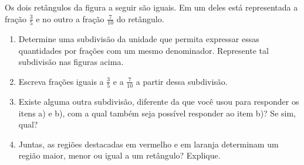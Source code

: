 \begin{atividade}{}\label{chap5-ativ5}

Os dois retângulos da figura a seguir são iguais. 
Em um deles está representada a fração $\frac{3}{5}$ e no outro a fração $\frac{7}{10}$ do retângulo.

\begin{center}
\end{center}

\begin{enumerate}  %
  \item     Determine uma subdivisão da unidade que permita expressar essas quantidades por frações com um mesmo denominador. Represente tal subdivisão nas figuras acima.
  \item     Escreva frações iguais a     $\frac{3}{5}$     e a     $\frac{7}{10}$     a partir dessa subdivisão.
  \item     Existe alguma outra subdivisão, diferente da que você usou para responder os itens a) e b), com a qual também seja possível responder ao item b)? Se sim, qual?
  \item     Juntas, as regiões destacadas em vermelho e em laranja determinam um região maior, menor ou igual a um retângulo? Explique.
\end{enumerate} %
\end{atividade}

